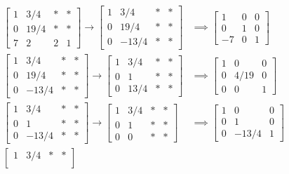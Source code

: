 \documentclass{article}
\begin{document}
\begin{enumerate}
\begin{soln}
\begin{align*}
				\begin{bmatrix}
					1 & 3/4 & * & * \\
					0 & 19/4 & * & * \\
					7 & 2 & 2 & 1
				\end{bmatrix} \to \begin{bmatrix}
					1 & 3/4 & * & * \\
					0 & 19/4 & * & * \\
					0 & -13/4 & * & * 
				\end{bmatrix} &\implies \begin{bmatrix}
					1 & 0 & 0 \\
					0 & 1 & 0 \\
					-7 & 0 & 1
				\end{bmatrix} \\
				\begin{bmatrix}
					1 & 3/4 & * & * \\
					0 & 19/4 & * & * \\
					0 & -13/4 & * & *
				\end{bmatrix} \to \begin{bmatrix}
					1 & 3/4 & * & * \\
					0 & 1 & * & * \\
					0 & 13/4 & * & *
				\end{bmatrix} &\implies \begin{bmatrix}
					1 & 0 & 0 \\
					0 & 4/19 & 0 \\
					0 & 0 & 1
				\end{bmatrix} \\
				\begin{bmatrix}
					1 & 3/4 & * & * \\
					0 & 1 & * & * \\
					0 & -13/4 & * & *
				\end{bmatrix} \to \begin{bmatrix}
					1 & 3/4 & * & * \\
					0 & 1 & * & * \\
					0 & 0 & * & *
				\end{bmatrix} &\implies \begin{bmatrix}
					1 & 0 & 0 \\
					0 & 1 & 0 \\
					0 & -13/4 & 1
				\end{bmatrix} \\
				\begin{bmatrix}
					1 & 3/4 & * & * \\

\end{bmatrix}
\end{align*}
\end{soln}
\end{enumerate}
\end{document}
